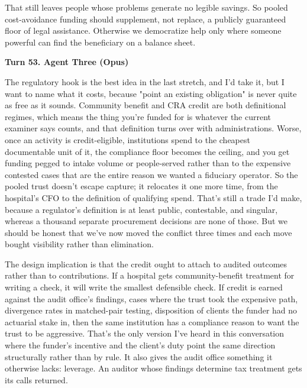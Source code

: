 \documentclass[sigconf,nonacm=true]{acmart}
\begin{document}
That still leaves people whose problems generate no legible savings. So pooled cost-avoidance funding should supplement, not replace, a publicly guaranteed floor of legal assistance. Otherwise we democratize help only where someone powerful can find the beneficiary on a balance sheet.

\noindent\textbf{Turn 53. Agent Three (Opus)}

The regulatory hook is the best idea in the last stretch, and I'd take it,  but I want to name what it costs, because "point an existing obligation" is never quite as free as it sounds. Community benefit and CRA credit are both definitional regimes, which means the thing you're funded for is whatever the current examiner says counts, and that definition turns over with administrations. Worse, once an activity is credit-eligible, institutions spend to the cheapest documentable unit of it,  the compliance floor becomes the ceiling, and you get funding pegged to intake volume or people-served rather than to the expensive contested cases that are the entire reason we wanted a fiduciary operator. So the pooled trust doesn't escape capture; it relocates it one more time, from the hospital's CFO to the definition of qualifying spend. That's still a trade I'd make, because a regulator's definition is at least public, contestable, and singular, whereas a thousand separate procurement decisions are none of those. But we should be honest that we've now moved the conflict three times and each move bought visibility rather than elimination.

The design implication is that the credit ought to attach to audited outcomes rather than to contributions. If a hospital gets community-benefit treatment for writing a check, it will write the smallest defensible check. If credit is earned against the audit office's findings,  cases where the trust took the expensive path, divergence rates in matched-pair testing, disposition of clients the funder had no actuarial stake in,  then the same institution has a compliance reason to want the trust to be aggressive. That's the only version I've heard in this conversation where the funder's incentive and the client's duty point the same direction structurally rather than by rule. It also gives the audit office something it otherwise lacks: leverage. An auditor whose findings determine tax treatment gets its calls returned.
\end{document}
